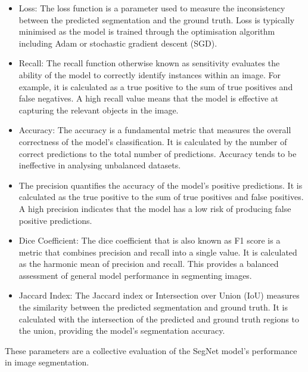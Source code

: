 \begin{itemize}
    \item Loss: The loss function is a parameter used to measure the inconsistency between the predicted segmentation and the ground truth. Loss is typically minimised as the model is trained through the optimisation algorithm including Adam or stochastic gradient descent (SGD).

    \item Recall: The recall function otherwise known as sensitivity evaluates the ability of the model to correctly identify instances within an image. For example, it is calculated as a true positive to the sum of true positives and false negatives. A high recall value means that the model is effective at capturing the relevant objects in the image.

    \item Accuracy: The accuracy is a fundamental metric that measures the overall correctness of the model's classification. It is calculated by the number of correct predictions to the total number of predictions. Accuracy tends to be ineffective in analysing unbalanced datasets.

    \item The precision quantifies the accuracy of the model's positive predictions. It is calculated as the true positive to the sum of true positives and false positives. A high precision indicates that the model has a low risk of producing false positive predictions.

    \item Dice Coefficient: The dice coefficient that is also known as F1 score is a metric that combines precision and recall into a single value. It is calculated as the harmonic mean of precision and recall. This provides a balanced assessment of general model performance in segmenting images.

    \item Jaccard Index: The Jaccard index or Intersection over Union (IoU) measures the similarity between the predicted segmentation and ground truth. It is calculated with the intersection of the predicted and ground truth regions to the union, providing the model's segmentation accuracy.
\end{itemize}

These parameters are a collective evaluation of the SegNet model's performance in image segmentation.





